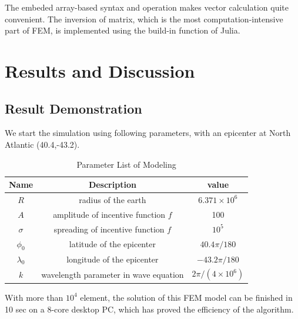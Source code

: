 \documentclass[a4paper]{article}
\begin{document}
The embeded array-based syntax and operation makes vector calculation quite convenient.
The inversion of matrix, which is the most computation-intensive part of FEM, is implemented using 
the build-in function of Julia. 

\section{Results and Discussion}
\subsection{Result Demonstration}

We start the simulation using following parameters, with an epicenter at 
North Atlantic (40.4,-43.2).
\begin{table}[h]
    \centering
    \label{tab:params_tab}
    \begin{tabular}{|c||c|c|} %
        \hline
        Name & Description & value\\
        \hline
        $R$ & radius of the earth & $6.371\times 10^6$ \\
        $A$   & amplitude of incentive function $f$ &  100\\
        $\sigma$   & spreading of incentive function $f$ &  $10^5$\\
        $\phi_0$ & latitude of the epicenter & $40.4\pi/180$ \\
        $\lambda_0$ & longitude of the epicenter & $-43.2\pi/180$\\
        $k$ & wavelength parameter in wave equation & $2\pi/(4\times 10^6)$\\
        \hline
    \end{tabular}
    \caption{Parameter List of Modeling}
\end{table}


With more than $10^4$ element, the solution of this FEM model can be finished in 10 sec on 
a 8-core desktop PC, which has proved the efficiency of the algorithm.
\end{document}

